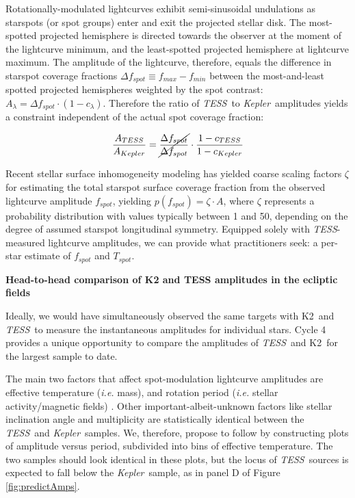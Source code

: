 \documentclass[letterpaper,12pt]{article}
\newcommand{\tess}{{\it TESS}}
\newcommand{\kepler}{{\it Kepler}}
\newcommand{\ktwo}{{K2}}
\begin{document}
Rotationally-modulated lightcurves exhibit semi-sinusoidal undulations as starspots (or spot groups) enter and exit the projected stellar disk.  The most-spotted projected hemisphere is directed towards the observer at the moment of the lightcurve minimum, and the least-spotted projected hemisphere at lightcurve maximum.  The amplitude of the lightcurve, therefore, equals the difference in starspot coverage fractions $\Delta f_{spot} \equiv f_{max}-f_{min}$ between the most-and-least spotted projected hemispheres weighted by the spot contrast: $ A_\lambda = \Delta f_{spot} \cdot (1-c_\lambda)$.  Therefore the ratio of \tess\ to \kepler\ amplitudes yields a constraint independent of the actual spot coverage fraction:

$$ \frac{A_{TESS}}{A_{Kepler}} = \cancel{\frac{\Delta f_{spot}}{\Delta f_{spot}}} \cdot \frac{1-c_{TESS}}{1-c_{Kepler}} $$

Recent stellar surface inhomogeneity modeling \cite{2018ApJ...853..122R, 2018ApJ...868..143G, 2018ApJ...865..142B} has yielded coarse scaling factors $\zeta$ for estimating the total starspot surface coverage fraction from the observed lightcurve amplitude $f_{spot}$, yielding $ p(f_{spot}) = \zeta \cdot A $, where $\zeta$ represents a probability distribution with values typically between 1 and 50, depending on the degree of assumed starspot longitudinal symmetry.  Equipped solely with \tess-measured lightcurve amplitudes, we can provide what practitioners seek: a per-star estimate of $f_{spot}$ and $T_{spot}$.

\textbf{Head-to-head comparison of K2 and TESS amplitudes in the ecliptic fields}

Ideally, we would have simultaneously observed the same targets with \ktwo\ and \tess\ to measure the instantaneous amplitudes for individual stars.  Cycle 4 provides a unique opportunity to compare the amplitudes of \tess\ and \ktwo\ for the largest sample to date.

The main two factors that affect spot-modulation lightcurve amplitudes are effective temperature (\emph{i.e.} mass), and rotation period (\emph{i.e.} stellar activity/magnetic fields) \cite{2014ApJS..211...24M}.  Other important-albeit-unknown factors like stellar inclination angle and multiplicity are statistically identical between the \tess\ and \kepler\ samples.  We, therefore, propose to follow \cite{2014ApJS..211...24M} by constructing plots of amplitude versus period, subdivided into bins of effective temperature.  The two samples should look identical in these plots, but the locus of \tess\ sources is expected to fall below the \kepler\ sample, as in panel D of Figure \ref{fig:predictAmps}.
\end{document}
